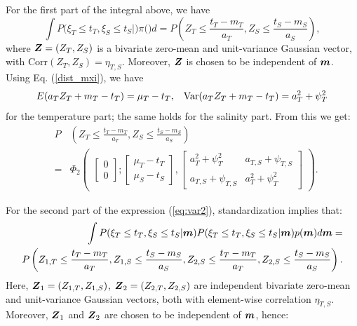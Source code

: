 \documentclass[aoas]{imsart}
\begin{document}
For the first part of the integral above, we have
\begin{equation}\label{part1:phi2}
 \int P(\xi_T \leq t_T, \xi_S \leq t_S|\bm) \pi(\bm) d\bm= 
P \left( Z_{T} \leq \frac{t_T-m_{T}}{a_{T}}, 
Z_{S} \leq \frac{t_S-m_{S}}{a_{S}} \right), \nonumber
\end{equation}
where ${\boldsymbol Z}=(Z_{T},Z_{S})$ is a bivariate zero-mean and unit-variance
Gaussian vector, with $\mbox{Corr}(Z_{T},Z_{S})=\eta_{T,S}$. Moreover,
${\boldsymbol Z}$ is chosen to be independent of ${\boldsymbol m}$. Using Eq. (\ref{dist_mxi}), we have
\begin{equation}
    E(a_{T} Z_{T}+m_{T}-t_T) = \mu_{T}-t_T, \hspace{3mm}
    \mbox{Var}(a_{T} Z_{T}+m_{T}-t_T) = a^2_T+ \psi^2_{T} 
\end{equation}
for the temperature part; the same holds for the salinity part. From this we get:
\begin{eqnarray}\label{two_parts0}
& P & \left( Z_{T} \leq \frac{t_T-m_{T}}{a_{T}}, 
Z_{S} \leq \frac{t_S-m_{S}}{a_{S}} \right) \\
&=& \Phi_2 \begin{pmatrix} 
\begin{bmatrix} 0\\
0
\end{bmatrix};
\begin{bmatrix} \mu_{T}-t_T\\
\mu_{S}-t_S
\end{bmatrix},\begin{bmatrix}
a^2_T+ \psi^2_{T} & a_{T,S}+\psi_{T,S}  \\
a_{T,S}+\psi_{T,S}   & a^2_T+ \psi^2_{T} 
\end{bmatrix}\end{pmatrix} \nonumber.
\end{eqnarray}

For the second part of the expression (\ref{eq:var2}), standardization
implies that: 
\begin{eqnarray}\label{part1:phi4}
&& \hspace{6mm} \int P(\xi_T \leq t_T, \xi_S \leq t_S|\bm) P(\xi_T \leq t_T, \xi_S \leq t_S|\bm) p(\bm) d\bm =  \\
&P& \hspace{-3mm} \left( Z_{1,T} \leq \frac{t_T-m_{T}}{a_{T}}, 
Z_{1,S} \leq \frac{t_S-m_{S}}{a_{S}},Z_{2,S} \leq \frac{t_T-m_{T}}{a_{T}}, 
Z_{2,S} \leq \frac{t_S-m_{S}}{a_{S}} \right). \nonumber
\end{eqnarray}
Here, ${\boldsymbol Z}_1=(Z_{1,T},Z_{1,S})$, ${\boldsymbol Z}_2=(Z_{2,T},Z_{2,S})$ are
independent bivariate zero-mean and unit-variance Gaussian vectors,
both with element-wise correlation $\eta_{T,S}$. Moreover, ${\boldsymbol Z}_1$ and
${\boldsymbol Z}_2$ are chosen to be independent of ${\boldsymbol m}$, hence:
\end{document}
